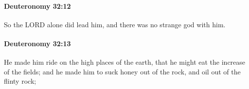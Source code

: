 		\paragraph{Deuteronomy 32:12} %
			\label{DEUTERONOMY-32-12}

			So the LORD alone did lead him, and there was no strange god with him.


		\paragraph{Deuteronomy 32:13} %
			\label{DEUTERONOMY-32-13}

			He made him ride on the high places of the earth, that he might eat the increase of the fields; and he made him to suck honey out of the rock, and oil out of the flinty rock;



